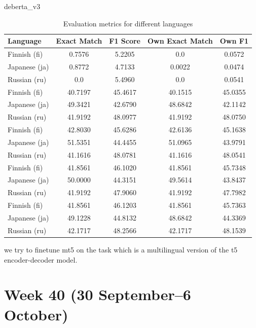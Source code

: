 \documentclass[11pt]{article}
\begin{document}
deberta\_v3 

\begin{table}[ht]
    \centering
    \begin{tabular}{|l|c|c|c|c|}
        \hline
        Language & Exact Match & F1 Score & Own Exact Match & Own F1 \\
        \hline
        Finnish (fi) & 0.7576 & 5.2205 & 0.0 & 0.0572 \\
        Japanese (ja) & 0.8772 & 4.7133 & 0.0022 & 0.0474 \\
        Russian (ru) & 0.0 & 5.4960 & 0.0 & 0.0541 \\
        \hline
        Finnish (fi) & 40.7197 & 45.4617 & 40.1515 & 45.0355 \\
        Japanese (ja) & 49.3421 & 42.6790 & 48.6842 & 42.1142 \\
        Russian (ru) & 41.9192 & 48.0977 & 41.9192 & 48.0750 \\
        \hline
        Finnish (fi) & 42.8030 & 45.6286 & 42.6136 & 45.1638 \\
        Japanese (ja) & 51.5351 & 44.4455 & 51.0965 & 43.9791 \\
        Russian (ru) & 41.1616 & 48.0781 & 41.1616 & 48.0541 \\
        \hline
        Finnish (fi) & 41.8561 & 46.1020 & 41.8561 & 45.7348 \\
        Japanese (ja) & 50.0000 & 44.3151 & 49.5614 & 43.8437 \\
        Russian (ru) & 41.9192 & 47.9060 & 41.9192 & 47.7982 \\
        \hline
        Finnish (fi) & 41.8561 & 46.1203 & 41.8561 & 45.7363 \\
        Japanese (ja) & 49.1228 & 44.8132 & 48.6842 & 44.3369 \\
        Russian (ru) & 42.1717 & 48.2566 & 42.1717 & 48.1539 \\
        \hline
    \end{tabular}
    \caption{Evaluation metrics for different languages}
    \label{tab:evaluation_metrics}
\end{table}

we try to finetune mt5 on the task which is a multilingual version of the t5 encoder-decoder model. 


\section{Week 40 (30 September--6 October)}
\end{document}
